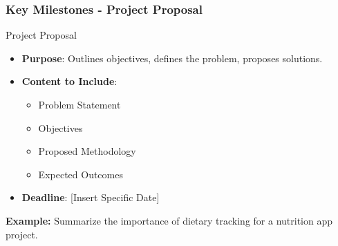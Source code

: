 \documentclass[aspectratio=169]{beamer}
\begin{document}
\begin{frame}[fragile]
  \frametitle{Key Milestones - Project Proposal}
  \begin{block}{Project Proposal}
    \begin{itemize}
      \item \textbf{Purpose}: Outlines objectives, defines the problem, proposes solutions.
      \item \textbf{Content to Include}:
        \begin{itemize}
          \item Problem Statement
          \item Objectives
          \item Proposed Methodology
          \item Expected Outcomes
        \end{itemize}
      \item \textbf{Deadline}: [Insert Specific Date]
    \end{itemize}
    \textbf{Example:} Summarize the importance of dietary tracking for a nutrition app project.
  \end{block}
\end{frame}
\end{document}
